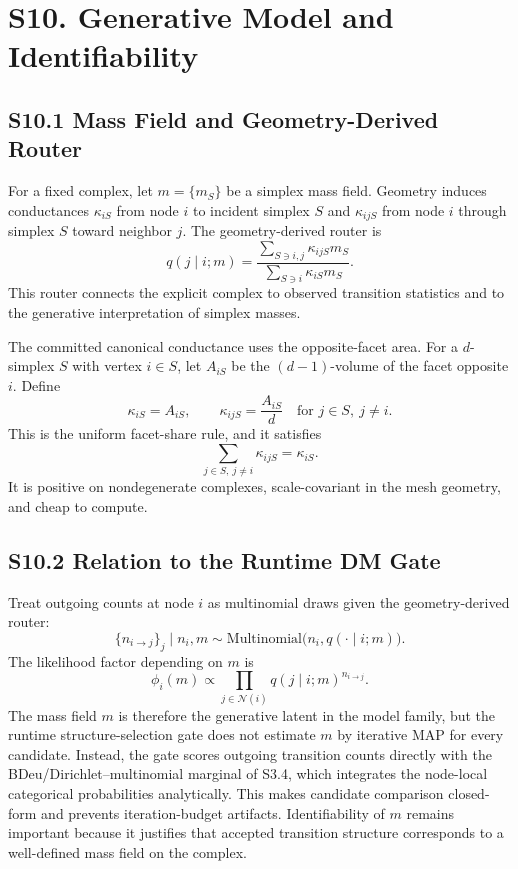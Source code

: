 \documentclass[11pt]{article}
\begin{document}
\section*{S10. Generative Model and Identifiability}

\subsection*{S10.1 Mass Field and Geometry-Derived Router}
For a fixed complex, let $m=\{m_S\}$ be a simplex mass field. Geometry induces conductances $\kappa_{iS}$ from node $i$ to incident simplex $S$ and $\kappa_{ijS}$ from node $i$ through simplex $S$ toward neighbor $j$. The geometry-derived router is
\[
q(j\mid i;m)=
\frac{\sum_{S\ni i,j}\kappa_{ijS}m_S}
{\sum_{S\ni i}\kappa_{iS}m_S}.
\]
This router connects the explicit complex to observed transition statistics and to the generative interpretation of simplex masses.

The committed canonical conductance uses the opposite-facet area. For a $d$-simplex $S$ with vertex $i\in S$, let $A_{iS}$ be the $(d-1)$-volume of the facet opposite $i$. Define
\[
\kappa_{iS}=A_{iS},
\qquad
\kappa_{ijS}=\frac{A_{iS}}{d}
\quad\text{for }j\in S,\ j\ne i.
\label{eq:si-canonical-kappa}
\]
This is the uniform facet-share rule, and it satisfies
\[
\sum_{j\in S,\ j\ne i}\kappa_{ijS}
=
\kappa_{iS}.
\]
It is positive on nondegenerate complexes, scale-covariant in the mesh geometry, and cheap to compute.

\subsection*{S10.2 Relation to the Runtime DM Gate}
Treat outgoing counts at node $i$ as multinomial draws given the geometry-derived router:
\[
\{n_{i\to j}\}_j\mid n_i,m
\sim
\mathrm{Multinomial}\bigl(n_i,q(\cdot\mid i;m)\bigr).
\]
The likelihood factor depending on $m$ is
\[
\phi_i(m)
\propto
\prod_{j\in\mathcal N(i)}
q(j\mid i;m)^{n_{i\to j}}.
\]
The mass field $m$ is therefore the generative latent in the model family, but the runtime structure-selection gate does not estimate $m$ by iterative MAP for every candidate. Instead, the gate scores outgoing transition counts directly with the BDeu/Dirichlet--multinomial marginal of S3.4, which integrates the node-local categorical probabilities analytically. This makes candidate comparison closed-form and prevents iteration-budget artifacts. Identifiability of $m$ remains important because it justifies that accepted transition structure corresponds to a well-defined mass field on the complex.
\end{document}
